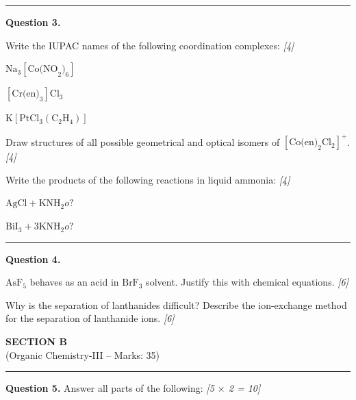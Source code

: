 \documentclass[11pt,a4paper]{article}
\newcommand{\pts}[1]{\hfill   \textit{[#1]}}
\begin{document}
\medskip\rule{\linewidth}{0.2pt}




\noindent   \textbf{Question 3.}

\begin{parts}
  \item Write the IUPAC names of the following coordination complexes: \pts{4}
  
\begin{parts}
    \item $ \text{Na}_3[ \text{Co(NO}_2)_6]$
    \item $[ \text{Cr(en)}_3] \text{Cl}_3$
    \item $ \text{K}[ \text{PtCl}_3( \text{C}_2 \text{H}_4)]$
  \end{parts}
  \item Draw structures of all possible geometrical and optical isomers of $[ \text{Co(en)}_2 \text{Cl}_2]^+$. \pts{4}
  \item Write the products of the following reactions in liquid ammonia: \pts{4}
  
\begin{parts}
    \item $ \text{AgCl} +  \text{KNH}_2  o ?$
    \item $ \text{BiI}_3 + 3 \text{KNH}_2  o ?$
  \end{parts}
\end{parts}

\medskip\rule{\linewidth}{0.2pt}




\noindent   \textbf{Question 4.}

\begin{parts}
  \item $ \text{AsF}_5$ behaves as an acid in $ \text{BrF}_3$ solvent. Justify this with chemical equations. \pts{6}
  \item Why is the separation of lanthanides difficult? Describe the ion-exchange method for the separation of lanthanide ions. \pts{6}
\end{parts}


\newpage

\begin{center}
  {\large\bfseries SECTION B}\\[2pt]
  {\normalsize (Organic Chemistry-III -- Marks: 35)}
\end{center}
\rule{0.4\linewidth}{0.2pt}
\smallskip




\noindent   \textbf{Question 5.} Answer all parts of the following: \pts{5 $ \times$ 2 = 10}
\end{document}
